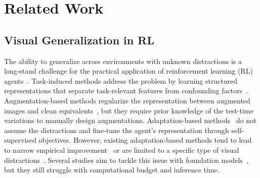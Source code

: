 \section{Related Work}
\subsection{Visual Generalization in RL}


The ability to generalize across environments with unknown distractions is a long-stand challenge for the practical application of reinforcement learning (RL) agents~\citep{chaplot2020object,shridhar2023perceiver,tomar2021learning,liu2023cross,ying2024peac}. Task-induced methods address the problem by learning structured representations that separate task-relevant features from confounding factors~\citep{fu2021learning,pan2022isolating,wang2022denoised}. Augmentation-based methods regularize the representation between augmented images and clean equivalents~\citep{hansen2021generalization,ha2023dream}, but they require prior knowledge of the test-time variations to manually design augmentations. Adaptation-based methods~\citep{Hansen2020SelfSupervisedPA,yang2024movie} do not assume the distractions and fine-tune the agent’s representation through self-supervised objectives. However, existing adaptation-based methods tend to lead to narrow empirical improvement~\citep{Hansen2020SelfSupervisedPA} or are limited to a specific type of visual distractions~\citep{yang2024movie}. Several studies aim to tackle this issue with foundation models~\citep{nair2022r3m,shah2023gnm}, but they still struggle with computational budget and inference time.

